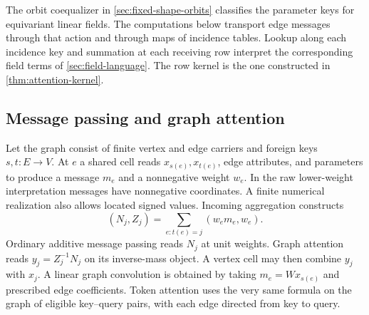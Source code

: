 \documentclass[11pt,a4paper]{article}
\theoremstyle{definition}
\theoremstyle{remark}\newaliascnt{remark}{theorem}
\numberwithin{equation}{section}
\begin{document}
The orbit coequalizer in \cref{sec:fixed-shape-orbits} classifies the parameter keys for equivariant linear fields. The computations below transport edge messages through that action and through maps of incidence tables. Lookup along each incidence key and summation at each receiving row interpret the corresponding field terms of \cref{sec:field-language}. The row kernel is the one constructed in \cref{thm:attention-kernel}.

\subsection{Message passing and graph attention}
Let the graph consist of finite vertex and edge carriers and foreign keys $s,t:E\to V$. At $e$ a shared cell reads $x_{s(e)},x_{t(e)}$, edge attributes, and parameters to produce a message $m_e$ and a nonnegative weight $w_e$. In the raw lower-weight interpretation messages have nonnegative coordinates. A finite numerical realization also allows located signed values. Incoming aggregation constructs
\[
 (N_j,Z_j)=\sum_{e:t(e)=j}(w_em_e,w_e).
\]
Ordinary additive message passing reads $N_j$ at unit weights. Graph attention reads $y_j=Z_j^{-1}N_j$ on its inverse-mass object. A vertex cell may then combine $y_j$ with $x_j$. A linear graph convolution is obtained by taking $m_e=W x_{s(e)}$ and prescribed edge coefficients. Token attention uses the very same formula on the graph of eligible key--query pairs, with each edge directed from key to query.
\end{document}
